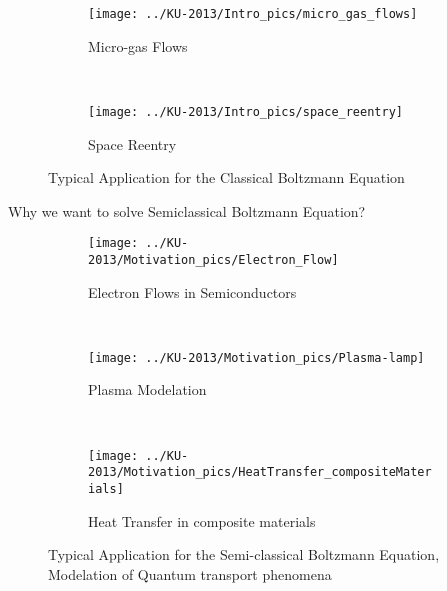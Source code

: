 \begin{frame}
 \begin{figure}
        \centering
        \begin{subfigure}[b]{0.30\textwidth}
                \centering
                \texttt{[image: ../KU-2013/Intro\_pics/micro\_gas\_flows]}
                \caption{Micro-gas Flows}
                \label{fig:micro_gas_flows}
        \end{subfigure}%
        ~ %
        \begin{subfigure}[b]{0.30\textwidth}
                \centering
                \texttt{[image: ../KU-2013/Intro\_pics/space\_reentry]}
                \caption{Space Reentry}
                \label{fig:space_reentry}
        \end{subfigure}
        \caption{Typical Application for the Classical Boltzmann Equation}
	\label{fig:Classical_Applications}
 \end{figure}
\end{frame}

\begin{frame}
 Why we want to solve Semiclassical Boltzmann Equation?
  \begin{figure}
        \centering
        \begin{subfigure}[b]{0.30\textwidth}
                \centering
                \texttt{[image: ../KU-2013/Motivation\_pics/Electron\_Flow]}
                \caption{Electron Flows in Semiconductors}
                \label{fig:Electron_Flow}
        \end{subfigure}
        ~ %
        \begin{subfigure}[b]{0.30\textwidth}
                \centering
                \texttt{[image: ../KU-2013/Motivation\_pics/Plasma-lamp]}
                \caption{Plasma Modelation}
                \label{fig:Plasma_lamp}
        \end{subfigure}
        ~ %
        \begin{subfigure}[b]{0.30\textwidth}
                \centering
                \texttt{[image: ../KU-2013/Motivation\_pics/HeatTransfer\_compositeMaterials]}
                \caption{Heat Transfer in composite materials}
                \label{fig:HeatTransfer_compositeMaterials}
        \end{subfigure}
        \caption{Typical Application for the Semi-classical Boltzmann Equation, Modelation of Quantum transport phenomena}
	\label{fig:Semiclassical_Applications}
 \end{figure}
\end{frame}

